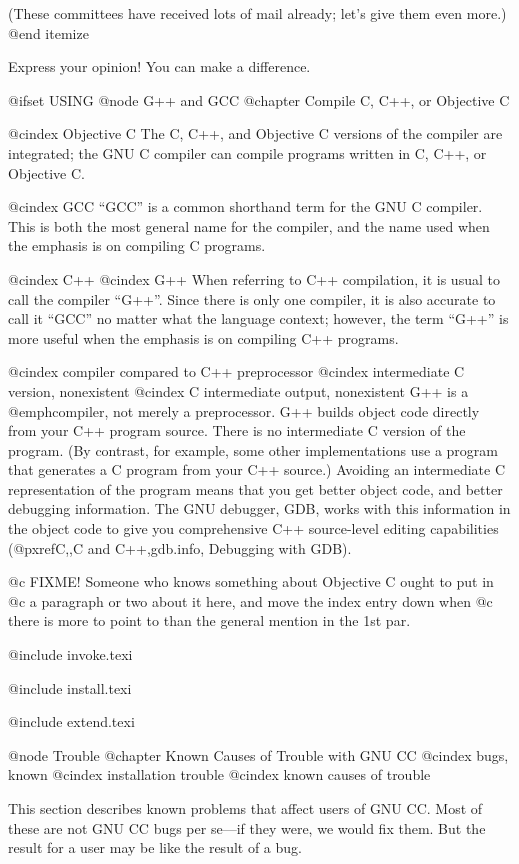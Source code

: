 (These committees have received lots of mail already; let's give them
even more.)
@end itemize

Express your opinion!  You can make a difference.

@ifset USING
@node G++ and GCC
@chapter Compile C, C++, or Objective C

@cindex Objective C
The C, C++, and Objective C versions of the compiler are integrated; the
GNU C compiler can compile programs written in C, C++, or Objective C.

@cindex GCC
``GCC'' is a common shorthand term for the GNU C compiler.  This is both
the most general name for the compiler, and the name used when the
emphasis is on compiling C programs.

@cindex C++
@cindex G++
When referring to C++ compilation, it is usual to call the compiler
``G++''.  Since there is only one compiler, it is also accurate to call
it ``GCC'' no matter what the language context; however, the term
``G++'' is more useful when the emphasis is on compiling C++ programs.

@cindex compiler compared to C++ preprocessor
@cindex intermediate C version, nonexistent
@cindex C intermediate output, nonexistent
G++ is a @emph{compiler}, not merely a preprocessor.  G++ builds object
code directly from your C++ program source.  There is no intermediate C
version of the program.  (By contrast, for example, some other
implementations use a program that generates a C program from your C++
source.)  Avoiding an intermediate C representation of the program means
that you get better object code, and better debugging information.  The
GNU debugger, GDB, works with this information in the object code to
give you comprehensive C++ source-level editing capabilities
(@pxref{C,,C and C++,gdb.info, Debugging with GDB}).

@c FIXME!  Someone who knows something about Objective C ought to put in
@c a paragraph or two about it here, and move the index entry down when
@c there is more to point to than the general mention in the 1st par.

@include invoke.texi

@include install.texi

@include extend.texi

@node Trouble
@chapter Known Causes of Trouble with GNU CC
@cindex bugs, known
@cindex installation trouble
@cindex known causes of trouble

This section describes known problems that affect users of GNU CC.  Most
of these are not GNU CC bugs per se---if they were, we would fix them.
But the result for a user may be like the result of a bug.


